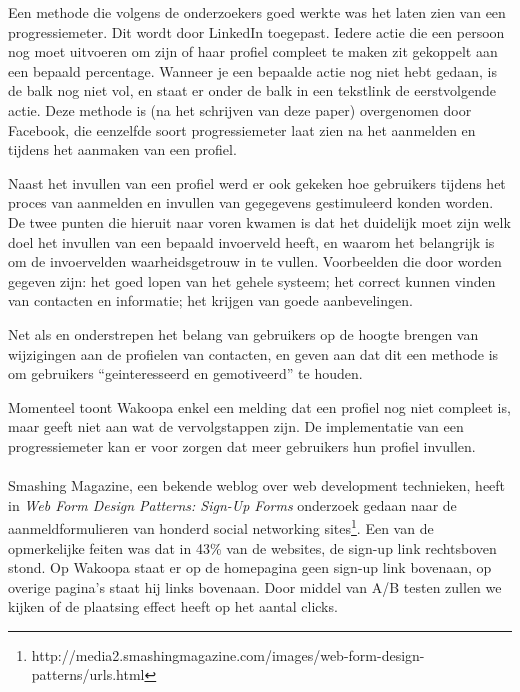 \documentclass[a4paper, 10pt, pdftex]{article}
\begin{document}
    Een methode die volgens de onderzoekers goed werkte was het laten zien van een progressiemeter. Dit wordt door LinkedIn toegepast. Iedere actie die een persoon nog moet uitvoeren om zijn of haar profiel compleet te maken zit gekoppelt aan een bepaald percentage. Wanneer je een bepaalde actie nog niet hebt gedaan, is de balk nog niet vol, en staat er onder de balk in een tekstlink de eerstvolgende actie. Deze methode is (na het schrijven van deze paper) overgenomen door Facebook, die eenzelfde soort progressiemeter laat zien na het aanmelden en tijdens het aanmaken van een profiel.

    Naast het invullen van een profiel werd er ook gekeken hoe gebruikers tijdens het proces van aanmelden en invullen van gegegevens gestimuleerd konden worden. De twee punten die hieruit naar voren kwamen is dat het duidelijk moet zijn welk doel het invullen van een bepaald invoerveld heeft, en waarom het belangrijk is om de invoervelden waarheidsgetrouw in te vullen. Voorbeelden die door \citeauthor{Brouns2008} worden gegeven zijn: het goed lopen van het gehele systeem; het correct kunnen vinden van contacten en informatie; het krijgen van goede aanbevelingen.

    Net als \citet{Berlanga2007} en \citet{Sohn2005} onderstrepen \citeauthor{Brouns2008} het belang van gebruikers op de hoogte brengen van wijzigingen aan de profielen van contacten, en geven aan dat dit een methode is om gebruikers ``geinteresseerd en gemotiveerd'' te houden.

Momenteel toont Wakoopa enkel een melding dat een profiel nog niet compleet is, maar geeft niet aan wat de vervolgstappen zijn. De implementatie van een progressiemeter kan er voor zorgen dat meer gebruikers hun profiel invullen.

    \paragraph{\cite{Editorial2008}}

    Smashing Magazine, een bekende weblog over web development technieken, heeft in \emph{Web Form Design Patterns: Sign-Up Forms} onderzoek gedaan naar de aanmeldformulieren van honderd social networking sites\footnote{http://media2.smashingmagazine.com/images/web-form-design-patterns/urls.html}. Een van de opmerkelijke feiten was dat in 43\% van de websites, de sign-up link rechtsboven stond. Op Wakoopa staat er op de homepagina geen sign-up link bovenaan, op overige pagina's staat hij links bovenaan. Door middel van A/B testen zullen we kijken of de plaatsing effect heeft op het aantal clicks.
\end{document}
